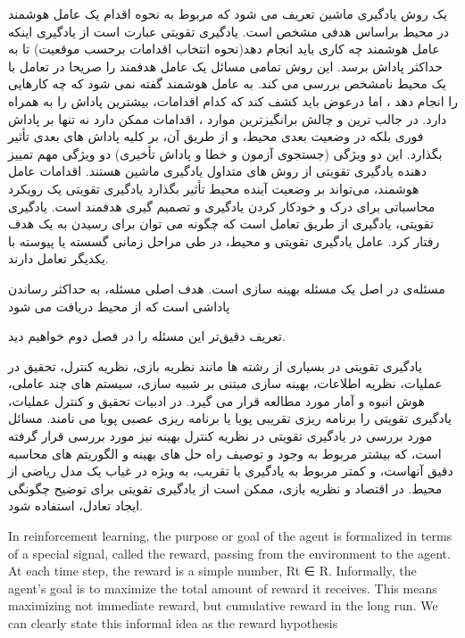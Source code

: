 


یک روش یادگیری ماشین تعریف می شود که مربوط به نحوه اقدام یک عامل هوشمند  در محیط براساس هدفی مشخص است. یادگیری تقویتی عبارت است از یادگیری اینکه عامل هوشمند چه کاری باید انجام دهد(نحوه انتخاب اقدامات برحسب موقعیت) تا به حداکثر پاداش برسد. این روش تمامی مسائل یک عامل هدفمند را صریحا در تعامل با یک محیط نامشخص بررسی می کند. به عامل هوشمند گفته نمی شود که چه کارهایی را انجام دهد ، اما درعوض باید کشف کند که کدام اقدامات، بیشترین پاداش را به همراه دارد. در جالب ترین و چالش برانگیزترین موارد ، اقدامات ممکن دارد نه تنها بر پاداش فوری بلکه در وضعیت بعدی محیط، و از طریق آن، بر کلیه پاداش های بعدی تأثیر بگذارد. این دو ویژگی (جستجوی آزمون و خطا و پاداش تأخیری) دو ویژگی مهم تمییز دهنده یادگیری تقویتی از روش های متداول یادگیری ماشین هستند.
اقدامات عامل هوشمند، می‌تواند بر وضعیت آینده محیط تأثیر بگذارد
یادگیری تقویتی یک رویکرد محاسباتی برای درک و خودکار کردن یادگیری و تصمیم گیری هدفمند است.
یادگیری تقویتی، یادگیری از  طریق تعامل است که چگونه می توان برای رسیدن به یک هدف رفتار کرد.
عامل یادگیری تقویتی و محیط، در طی مراحل زمانی گسسته یا پیوسته با یکدیگر تعامل دارند.


مسئله‌ی  در اصل یک مسئله بهینه سازی است. هدف اصلی مسئله، به حداکثر رساندن پاداشی است که از محیط دریافت می شود


تعریف دقیق‌تر این مسئله را در فصل دوم خواهیم دید.



یادگیری تقویتی
در بسیاری از رشته ها مانند نظریه بازی، نظریه کنترل، تحقیق در عملیات، نظریه اطلاعات، بهینه سازی مبتنی بر شبیه سازی، سیستم های چند عاملی، هوش انبوه و آمار مورد مطالعه قرار می گیرد. در ادبیات تحقیق و کنترل عملیات، یادگیری تقویتی را برنامه ریزی تقریبی پویا   یا برنامه ریزی عصبی پویا   می نامند. مسائل مورد بررسی در یادگیری تقویتی در نظریه کنترل بهینه  نیز مورد بررسی قرار گرفته است، که بیشتر مربوط به وجود و توصیف راه حل های بهینه و الگوریتم های محاسبه دقیق آنهاست، و کمتر مربوط به یادگیری یا تقریب، به ویژه در غیاب یک مدل ریاضی از محیط. در اقتصاد و نظریه بازی، ممکن است از یادگیری تقویتی برای توضیح چگونگی ایجاد تعادل، استفاده شود.

In reinforcement learning, the purpose or goal of the agent is formalized in terms of a special signal,
called the reward, passing from the environment to the agent. At each time step, the reward is a simple
number, Rt ∈ R. Informally, the agent’s goal is to maximize the total amount of reward it receives.
This means maximizing not immediate reward, but cumulative reward in the long run. We can clearly
state this informal idea as the reward hypothesis

